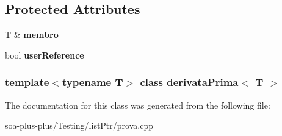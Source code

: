 \subsection*{Protected Attributes}
\begin{DoxyCompactItemize}
\item 
\hypertarget{classderivata_prima_a53cd18355bc6df7a380078bbc59ff04e}{
T \& {\bfseries membro}}
\label{classderivata_prima_a53cd18355bc6df7a380078bbc59ff04e}

\item 
\hypertarget{classderivata_prima_a3a295d707a57497897889986a8134e7e}{
bool {\bfseries userReference}}
\label{classderivata_prima_a3a295d707a57497897889986a8134e7e}

\end{DoxyCompactItemize}
\subsubsection*{template$<$typename T$>$ class derivataPrima$<$ T $>$}



The documentation for this class was generated from the following file:\begin{DoxyCompactItemize}
\item 
soa-\/plus-\/plus/Testing/listPtr/prova.cpp\end{DoxyCompactItemize}
